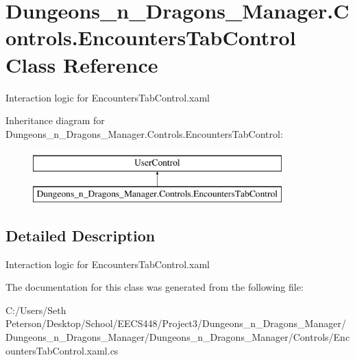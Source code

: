 \hypertarget{class_dungeons__n___dragons___manager_1_1_controls_1_1_encounters_tab_control}{}\section{Dungeons\+\_\+n\+\_\+\+Dragons\+\_\+\+Manager.\+Controls.\+Encounters\+Tab\+Control Class Reference}
\label{class_dungeons__n___dragons___manager_1_1_controls_1_1_encounters_tab_control}


Interaction logic for Encounters\+Tab\+Control.\+xaml  


Inheritance diagram for Dungeons\+\_\+n\+\_\+\+Dragons\+\_\+\+Manager.\+Controls.\+Encounters\+Tab\+Control\+:\begin{figure}[H]
\begin{center}
\leavevmode
\includegraphics[height=2.000000cm]{class_dungeons__n___dragons___manager_1_1_controls_1_1_encounters_tab_control}
\end{center}
\end{figure}


\subsection{Detailed Description}
Interaction logic for Encounters\+Tab\+Control.\+xaml 



The documentation for this class was generated from the following file\+:\begin{DoxyCompactItemize}
\item 
C\+:/\+Users/\+Seth Peterson/\+Desktop/\+School/\+E\+E\+C\+S448/\+Project3/\+Dungeons\+\_\+n\+\_\+\+Dragons\+\_\+\+Manager/\+Dungeons\+\_\+n\+\_\+\+Dragons\+\_\+\+Manager/\+Dungeons\+\_\+n\+\_\+\+Dragons\+\_\+\+Manager/\+Controls/Encounters\+Tab\+Control.\+xaml.\+cs\end{DoxyCompactItemize}
